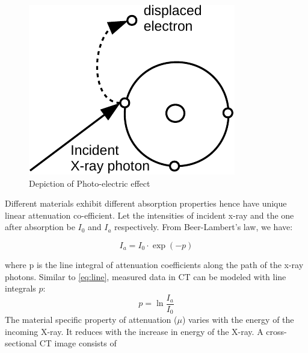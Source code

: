 \begin{figure}[!htbp]
	\centering
	\includegraphics[width=0.5\linewidth]{./Figures/photo-crop.pdf}
	\caption{Depiction of Photo-electric effect}
	\label{fig:photo}
\end{figure}


Different materials exhibit different absorption properties hence have unique linear attenuation co-efficient. Let the intensities of incident x-ray and the one after absorption be $I_{0}$ and $I_{a}$ respectively. From Beer-Lambert's law, we have:

\begin{equation}\label{eq:BL}
I_{a} = I_{0} \cdot \exp (-p) 
\end{equation}

where p is the line integral of attenuation coefficients along the path of the x-ray photons. Similar to \ref{eq:line}, measured data in \ac{CT} can be modeled with line integrals $p$:
\begin{equation}\label{eq:l_CT}
p =\ln \frac{I_{a}}{I_{0}} 
\end{equation}
The material specific property of attenuation ($\mu$) varies with the energy of the incoming X-ray. It reduces with the increase in energy of the X-ray. A cross-sectional \ac{CT} image consists of 

